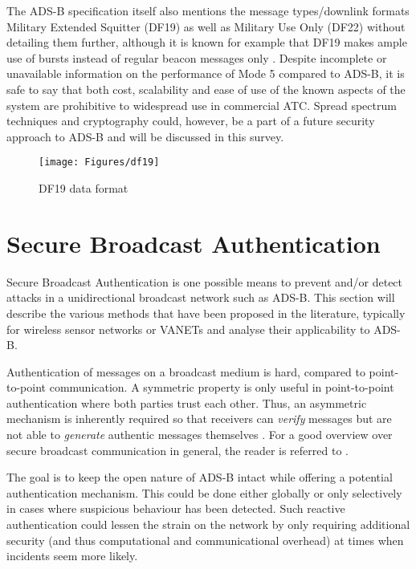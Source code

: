\documentclass[english]{IEEEtran}
\begin{document}
The ADS-B specification itself also mentions the message types/downlink
formats Military Extended Squitter (DF19) as well as Military Use
Only (DF22) without detailing them further, although it is known for
example that DF19 makes ample use of bursts instead of regular beacon
messages only \cite{DO209}. Despite incomplete or unavailable information
on the performance of Mode 5 compared to ADS-B, it is safe to say
that both cost, scalability and ease of use of the known aspects of
the system are prohibitive to widespread use in commercial ATC. Spread
spectrum techniques and cryptography could, however, be a part of
a future security approach to ADS-B and will be discussed in this
survey. 
\begin{figure}
\texttt{[image: Figures/df19]}

\caption{DF19 data format \cite{DO209}}
\end{figure}



\section{Secure Broadcast Authentication \label{sec:Secure-Broadcast-Authentication}}

Secure Broadcast Authentication is one possible means to prevent and/or
detect attacks in a unidirectional broadcast network such as ADS-B.
This section will describe the various methods that have been proposed
in the literature, typically for wireless sensor networks or VANETs
and analyse their applicability to ADS-B. 

Authentication of messages on a broadcast medium is hard, compared
to point-to-point communication.\emph{ }A symmetric property is only
useful in point-to-point authentication where both parties trust each
other. Thus, an asymmetric mechanism is inherently required so that
receivers can \emph{verify} messages but are not able to \emph{generate}
authentic messages themselves\emph{ }\cite{Luk2006}. For a good overview
over secure broadcast communication in general, the reader is referred
to \cite{Perrig2003}.

The goal is to keep the open nature of ADS-B intact while offering
a potential authentication mechanism. This could be done either globally
or only selectively in cases where suspicious behaviour has been detected.
Such reactive authentication could lessen the strain on the network
by only requiring additional security (and thus computational and
communicational overhead) at times when incidents seem more likely. 
\end{document}
